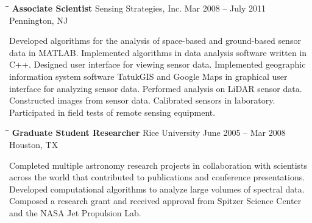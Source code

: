 \documentclass{res}
\begin{document}
\begin{resume}
   \begin{tabbing}
   \hspace{2.3in}\= \hspace{2.6in}\= \kill %
    {\bf Associate Scientist} \>Sensing Strategies, Inc.     \>Mar 2008 -- July 2011\\
                             \>Pennington, NJ
   \end{tabbing}\vspace{-20pt}      %
Developed algorithms for the analysis of space-based and ground-based sensor data in MATLAB.  Implemented algorithms in data analysis software written in C++.  Designed user interface for viewing sensor data.  Implemented geographic information system software TatukGIS and Google Maps in graphical user interface for analyzing sensor data.  Performed analysis on LiDAR sensor data.  Constructed images from sensor data.  Calibrated sensors in laboratory.  Participated in field tests of remote sensing equipment.

       
   \begin{tabbing}
   \hspace{2.3in}\= \hspace{2.6in}\= \kill %
    {\bf Graduate Student Researcher} \>Rice University     \>June 2005 -- Mar 2008\\
                             \>Houston, TX
   \end{tabbing}\vspace{-20pt}      %
Completed multiple astronomy research projects in collaboration with scientists across the world that contributed to publications and conference presentations.  Developed computational algorithms to analyze large volumes of spectral data.  Composed a research grant and received approval from Spitzer Science Center and the NASA Jet Propulsion Lab. 
    

\end{resume}
\end{document}
